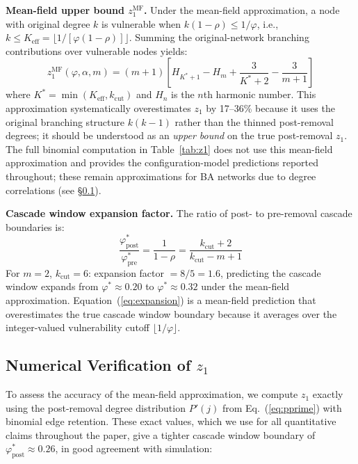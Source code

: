 \documentclass[aps,pre,twocolumn,superscriptaddress,showpacs]{revtex4-2}
\newcommand{\kcut}{k_{\text{cut}}}
\newcommand{\keff}{K_{\text{eff}}}
\begin{document}
\textbf{Mean-field upper bound $z_1^{\mathrm{MF}}$.} Under the mean-field approximation, a node with original degree $k$ is vulnerable when $k(1-\rho) \leq 1/\varphi$, i.e., $k \leq \keff = \lfloor 1/[\varphi(1-\rho)] \rfloor$. Summing the original-network branching contributions over vulnerable nodes yields:
\begin{equation}
z_1^{\mathrm{MF}}(\varphi, \alpha, m) = (m+1) \left[ H_{K^*+1} - H_m + \frac{3}{K^*+2} - \frac{3}{m+1} \right]
\label{eq:z1mf}
\end{equation}
where $K^* = \min(\keff, \kcut)$ and $H_n$ is the $n$th harmonic number. This approximation systematically overestimates $z_1$ by 17--36\% because it uses the original branching structure $k(k-1)$ rather than the thinned post-removal degrees; it should be understood as an \emph{upper bound} on the true post-removal $z_1$. The full binomial computation in Table~\ref{tab:z1} does not use this mean-field approximation and provides the configuration-model predictions reported throughout; these remain approximations for BA networks due to degree correlations (see \S\ref{sec:z1verify}).

\textbf{Cascade window expansion factor.} The ratio of post- to pre-removal cascade boundaries is:
\begin{equation}
\frac{\varphi^*_{\mathrm{post}}}{\varphi^*_{\mathrm{pre}}} = \frac{1}{1-\rho} = \frac{\kcut+2}{\kcut - m + 1}
\label{eq:expansion}
\end{equation}
For $m=2$, $\kcut=6$: expansion factor $= 8/5 = 1.6$, predicting the cascade window expands from $\varphi^* \approx 0.20$ to $\varphi^* \approx 0.32$ under the mean-field approximation. Equation~(\ref{eq:expansion}) is a mean-field prediction that overestimates the true cascade window boundary because it averages over the integer-valued vulnerability cutoff $\lfloor 1/\varphi \rfloor$.

\subsection{Numerical Verification of $z_1$}
\label{sec:z1verify}

To assess the accuracy of the mean-field approximation, we compute $z_1$ exactly using the post-removal degree distribution $P'(j)$ from Eq.~(\ref{eq:pprime}) with binomial edge retention. These exact values, which we use for all quantitative claims throughout the paper, give a tighter cascade window boundary of $\varphi^*_{\mathrm{post}} \approx 0.26$, in good agreement with simulation:
\end{document}
